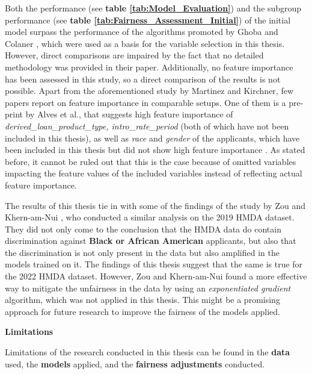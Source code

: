 



Both the performance (see \textbf{table \ref{tab:Model_Evaluation}}) and the subgroup performance (see \textbf{table \ref{tab:Fairness_Assessment_Initial}}) of the initial model surpass the performance of the algorithms promoted by Ghoba and Colaner \parencite{Ghoba}, which were used as a basis for the variable selection in this thesis. However, direct comparisons are impaired by the fact that no detailed methodology was provided in their paper.
Additionally, no feature importance has been assessed in this study, so a direct comparison of the results is not possible. Apart from the aforementioned study by Martinez and Kirchner, few papers report on feature importance in comparable setups. 
One of them is a pre-print by Alves et al., that suggests high feature importance of \textit{derived\_loan\_product\_type, intro\_rate\_period} (both of which have not been included in this thesis), as well as \textit{race} and \textit{gender} of the applicants, which have been included in this thesis but did not show high feature importance \parencite{alves:hal-03033181}.
As stated before, it cannot be ruled out that this is the case because of omitted variables impacting the feature values of the included variables instead of reflecting actual feature importance.

The results of this thesis tie in with some of the findings of the study by Zou and Khern-am-Nui \parencite{Zou2023}, who conducted a similar analysis on the 2019 HMDA dataset.
They did not only come to the conclusion that the HMDA data do contain discrimination against \textbf{Black or African American} applicants, but also that the discrimination is not only present in the data but also amplified in the models trained on it. The findings of this thesis suggest that the same is true for the 2022 HMDA dataset.
However, Zou and Khern-am-Nui found a more effective way to mitigate the unfairness in the data by using an \textit{exponentiated gradient} algorithm, which was not applied in this thesis. This might be a promising approach for future research to improve the fairness of the models applied.




\textbf{Limitations}

Limitations of the research conducted in this thesis can be found in the \textbf{data} used, the \textbf{models} applied, and the \textbf{fairness adjustments} conducted.

